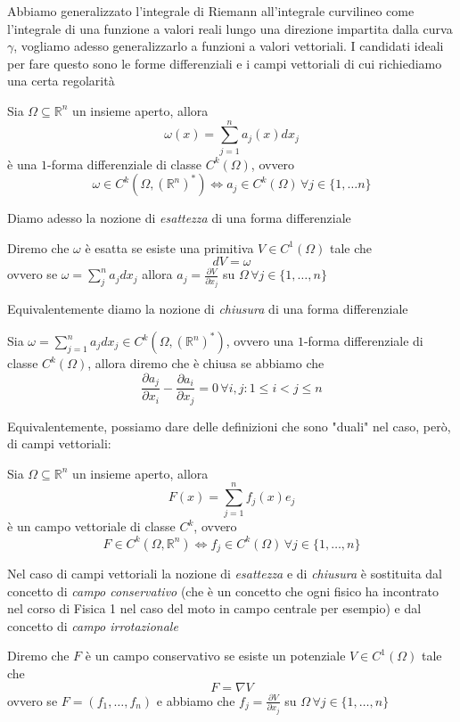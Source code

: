 Abbiamo generalizzato l'integrale di Riemann all'integrale curvilineo come l'integrale di una funzione a valori reali lungo una direzione impartita dalla curva $\gamma$, vogliamo adesso generalizzarlo a funzioni a valori vettoriali. I candidati ideali per fare questo sono le forme differenziali e i campi vettoriali di cui richiediamo una certa regolarità
\begin{definition}
Sia $\Omega \subseteq \mathbb{R}^n$ un insieme aperto, allora $$\omega(x) = \sum_{j=1}^n a_j(x)dx_j$$ è una $1$-forma differenziale di classe
$C^k(\Omega)$, ovvero
$$
\omega \in C^k(\Omega, (\mathbb{R}^n)^*) \iff a_j \in C^k(\Omega) \, \forall j \in \{1, \ldots n \}
$$
\end{definition}
Diamo adesso la nozione di \emph{esattezza} di una forma differenziale
\begin{definition}
	Diremo che $\omega$ è esatta se esiste una primitiva $V \in C^1(\Omega)$ tale che
	$$
		dV = \omega
	$$
	ovvero se $\omega = \sum\limits_{j}^n a_j dx_j$ allora $a_j = \frac{\partial V}{\partial x_j}$ su $\Omega \, \forall j \in \{1, \ldots, n\}$
\end{definition}
Equivalentemente diamo la nozione di \emph{chiusura} di una forma differenziale
\begin{definition}
	Sia $\omega = \sum_{j=1}^n a_j dx_j \in C^k(\Omega, (\mathbb{R}^n)^*)$, ovvero una $1$-forma differenziale di classe $C^k(\Omega)$, allora diremo che
	è chiusa se abbiamo che
	$$
		\frac{\partial a_j}{\partial x_i} - \frac{\partial a_i}{\partial x_j} = 0 \, \forall i, j: 1 \leq i < j \leq n
	$$
\end{definition}
Equivalentemente, possiamo dare delle definizioni che sono "duali" nel caso, però, di campi vettoriali:
\begin{definition}
	Sia $\Omega \subseteq \mathbb{R}^n$ un insieme aperto, allora $$F(x)=\sum_{j=1}^n f_j(x)e_j$$ è un campo vettoriale di classe $C^k$, ovvero 
	$$F \in C^k(\Omega, \mathbb{R}^n) \iff f_j \in C^k(\Omega) \, \forall j \in \{1, \ldots, n\} $$
\end{definition}
Nel caso di campi vettoriali la nozione di \emph{esattezza} e di \emph{chiusura} è sostituita dal concetto di \emph{campo conservativo} (che è un concetto che ogni fisico ha incontrato nel corso di Fisica 1
nel caso del moto in campo centrale per esempio) e dal concetto di \emph{campo irrotazionale}
\begin{definition}
	Diremo che $F$ è un campo conservativo se esiste un potenziale $V \in C^1(\Omega)$ tale che
	$$
	F = \nabla V
	$$
	ovvero se $F=(f_1, \ldots, f_n)$ e abbiamo che $f_j = \frac{\partial V}{\partial x_j}$ su $\Omega \, \forall j \in \{1, \ldots, n \}$
\end{definition}
